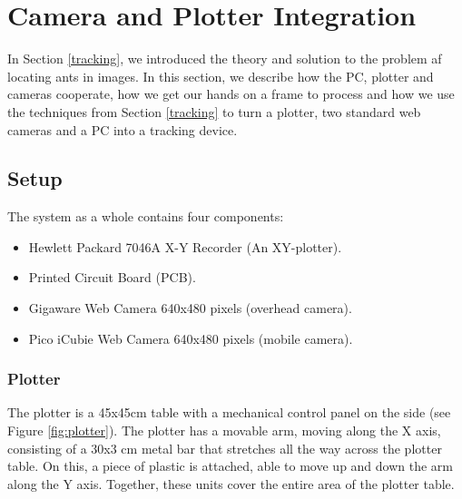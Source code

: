 
\section{Camera and Plotter Integration}


In Section \ref{tracking}, we introduced the theory and solution to the problem af locating ants in images. In this section, we describe how the PC, plotter and cameras cooperate, how we get our hands on a frame to process and how we use the techniques from Section \ref{tracking} to turn a plotter, two standard web cameras and a PC into a tracking device.

\subsection{Setup}
\label{sec:setup}

The system as a whole contains four components:

\begin{itemize}
  \item Hewlett Packard 7046A X-Y Recorder (An XY-plotter).
  \item Printed Circuit Board (PCB).
  \item Gigaware Web Camera 640x480 pixels (overhead camera).
  \item Pico iCubie Web Camera 640x480 pixels (mobile camera).
\end{itemize}

\subsubsection{Plotter} \mbox{} \par
The plotter is a 45x45cm table with a mechanical control panel on the side (see Figure \ref{fig:plotter}). The plotter has a movable arm, moving along the X axis, consisting of a 30x3 cm metal bar that stretches all the way across the plotter table. On this, a piece of plastic is attached, able to move up and down the arm along the Y axis. Together, these units cover the entire area of the plotter table. \\

